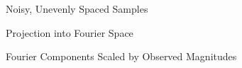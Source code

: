\documentclass[serif,mathserif,professionalfont]{beamer}
\begin{document}
\begin{frame}{Noisy, Unevenly Spaced Samples}
\begin{figure}
\centering

\end{figure} 
\end{frame}


\begin{frame}{Projection into Fourier Space}
\makebox[\textwidth][c]{}
\end{frame}

\begin{frame}{Fourier Components Scaled by Observed Magnitudes}
\makebox[\textwidth][c]{}
\end{frame}
\end{document}
